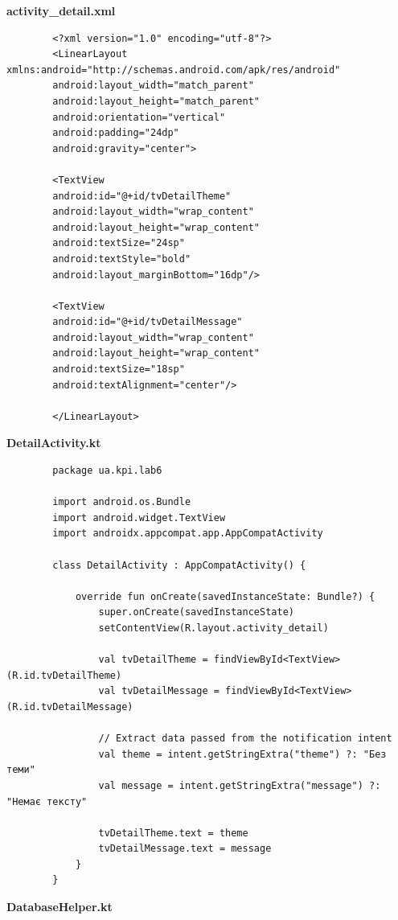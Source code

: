 \documentclass[14pt, a4paper]{extreport}
\begin{document}
	\textbf{activity\_detail.xml}
	
	\begin{verbatim} 
		<?xml version="1.0" encoding="utf-8"?>
		<LinearLayout xmlns:android="http://schemas.android.com/apk/res/android"
		android:layout_width="match_parent"
		android:layout_height="match_parent"
		android:orientation="vertical"
		android:padding="24dp"
		android:gravity="center">
		
		<TextView
		android:id="@+id/tvDetailTheme"
		android:layout_width="wrap_content"
		android:layout_height="wrap_content"
		android:textSize="24sp"
		android:textStyle="bold"
		android:layout_marginBottom="16dp"/>
		
		<TextView
		android:id="@+id/tvDetailMessage"
		android:layout_width="wrap_content"
		android:layout_height="wrap_content"
		android:textSize="18sp"
		android:textAlignment="center"/>
		
		</LinearLayout>
	\end{verbatim}
	
	\textbf{DetailActivity.kt}
	
	\begin{verbatim} 
		package ua.kpi.lab6
		
		import android.os.Bundle
		import android.widget.TextView
		import androidx.appcompat.app.AppCompatActivity
		
		class DetailActivity : AppCompatActivity() {
			
			override fun onCreate(savedInstanceState: Bundle?) {
				super.onCreate(savedInstanceState)
				setContentView(R.layout.activity_detail)
				
				val tvDetailTheme = findViewById<TextView>(R.id.tvDetailTheme)
				val tvDetailMessage = findViewById<TextView>(R.id.tvDetailMessage)
				
				// Extract data passed from the notification intent
				val theme = intent.getStringExtra("theme") ?: "Без теми"
				val message = intent.getStringExtra("message") ?: "Немає тексту"
				
				tvDetailTheme.text = theme
				tvDetailMessage.text = message
			}
		}
	\end{verbatim}
	
	\textbf{DatabaseHelper.kt}
	
\end{document}
